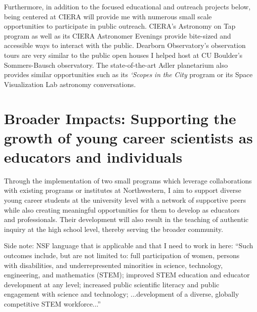 \documentclass[aasms,12pt]{article}
\begin{document}
Furthermore, in addition to the focused educational and outreach projects below, being centered at CIERA will provide me with numerous small scale opportunities to participate in public outreach.
CIERA's Astronomy on Tap program as well as its CIERA Astronomer Evenings provide bite-sized and accessible ways to interact with the public.
Dearborn Observatory's observation tours are very similar to the public open houses I helped host at CU Boulder's Sommers-Bausch observatory.
The state-of-the-art Adler planetarium also provides similar opportunities such as its \emph{`Scopes in the City} program or its Space Visualization Lab astronomy conversations.


\section{Broader Impacts: Supporting the growth of young career scientists as educators and individuals}
\label{sct:outreach}
Through the implementation of two small programs which leverage collaborations with existing programs or institutes at Northwestern, I aim to support diverse young career students at the university level with a network of supportive peers while also creating meaningful opportunities for them to develop as educators and professionals.
Their development will also result in the teaching of authentic inquiry at the high school level, thereby serving the broader community.

Side note: NSF language that is applicable and that I need to work in here: ``Such outcomes include, but are not limited to: full participation of women, persons with disabilities, and underrepresented minorities in science, technology, engineering, and mathematics (STEM); improved STEM education and educator development at any level; increased public scientific literacy and public engagement with science and technology; ...development of a diverse, globally competitive STEM workforce...''
\end{document}
